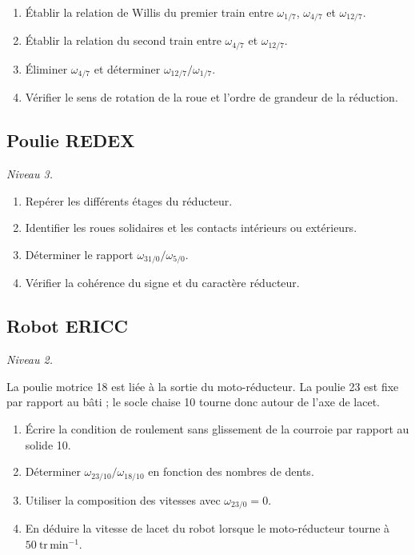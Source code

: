 \begin{enumerate}
  \item Établir la relation de Willis du premier train entre $\omega_{1/7}$, $\omega_{4/7}$ et $\omega_{12/7}$.
  \item Établir la relation du second train entre $\omega_{4/7}$ et $\omega_{12/7}$.
  \item Éliminer $\omega_{4/7}$ et déterminer $\omega_{12/7}/\omega_{1/7}$.
  \item Vérifier le sens de rotation de la roue et l'ordre de grandeur de la réduction.
\end{enumerate}

\subsection{Poulie REDEX}

\textit{Niveau 3.}


\begin{enumerate}
  \item Repérer les différents étages du réducteur.
  \item Identifier les roues solidaires et les contacts intérieurs ou extérieurs.
  \item Déterminer le rapport $\omega_{31/0}/\omega_{5/0}$.
  \item Vérifier la cohérence du signe et du caractère réducteur.
\end{enumerate}

\subsection{Robot ERICC}

\textit{Niveau 2.}

La poulie motrice 18 est liée à la sortie du moto-réducteur. La poulie
23 est fixe par rapport au bâti ; le socle chaise 10 tourne donc autour
de l'axe de lacet.

\begin{center}
\hfill
{}\hfill
{}
\end{center}

\begin{enumerate}
  \item Écrire la condition de roulement sans glissement de la courroie par rapport au solide 10.
  \item Déterminer $\omega_{23/10}/\omega_{18/10}$ en fonction des nombres de dents.
  \item Utiliser la composition des vitesses avec $\omega_{23/0}=0$.
  \item En déduire la vitesse de lacet du robot lorsque le moto-réducteur tourne à $50\ \mathrm{tr\,min^{-1}}$.
\end{enumerate}

